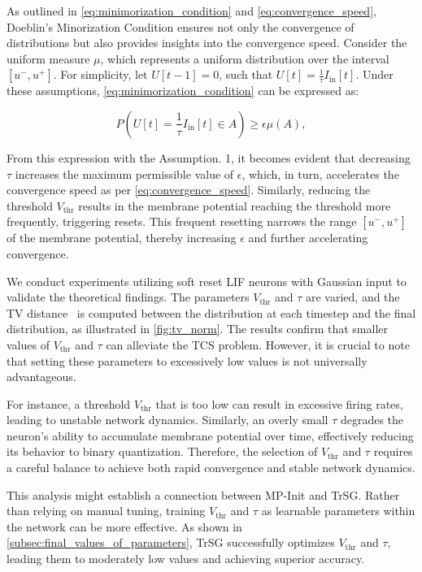 As outlined in \cref{eq:minimorization_condition} and \cref{eq:convergence_speed}, Doeblin’s Minorization Condition ensures not only the convergence of distributions but also provides insights into the convergence speed. Consider the uniform measure \(\mu\), which represents a uniform distribution over the interval \([u^{-}, u^{+}]\). For simplicity, let \(U[t-1] = 0\), such that \(U[t] = \frac{1}{\tau} I_{\text{in}}[t]\). Under these assumptions, \cref{eq:minimorization_condition} can be expressed as:

\begin{equation}
    P\left(U[t] = \frac{1}{\tau} I_{\text{in}}[t] \in A\right) \geq \epsilon \mu(A),
\end{equation}

From this expression with the Assumption. 1, it becomes evident that decreasing \(\tau\) increases the maximum permissible value of \(\epsilon\), which, in turn, accelerates the convergence speed as per \cref{eq:convergence_speed}. Similarly, reducing the threshold \(V_{\text{thr}}\) results in the membrane potential reaching the threshold more frequently, triggering resets. This frequent resetting narrows the range \([u^{-}, u^{+}]\) of the membrane potential, thereby increasing \(\epsilon\) and further accelerating convergence.

We conduct experiments utilizing soft reset LIF neurons with Gaussian input to validate the theoretical findings. The parameters \(V_{\text{thr}}\) and \(\tau\) are varied, and the TV distance~\cite{rosenthal:1995} is computed between the distribution at each timestep and the final distribution, as illustrated in \cref{fig:tv_norm}. The results confirm that smaller values of \(V_{\text{thr}}\) and \(\tau\) can alleviate the TCS problem. However, it is crucial to note that setting these parameters to excessively low values is not universally advantageous.

For instance, a threshold \(V_{\text{thr}}\) that is too low can result in excessive firing rates, leading to unstable network dynamics. Similarly, an overly small \(\tau\) degrades the neuron’s ability to accumulate membrane potential over time, effectively reducing its behavior to binary quantization. Therefore, the selection of \(V_{\text{thr}}\) and \(\tau\) requires a careful balance to achieve both rapid convergence and stable network dynamics.

This analysis might establish a connection between MP-Init and TrSG. Rather than relying on manual tuning, training \(V_{\text{thr}}\) and \(\tau\) as learnable parameters within the network can be more effective. As shown in \cref{subsec:final_values_of_parameters}, TrSG successfully optimizes \(V_{\text{thr}}\) and \(\tau\), leading them to moderately low values and achieving superior accuracy.